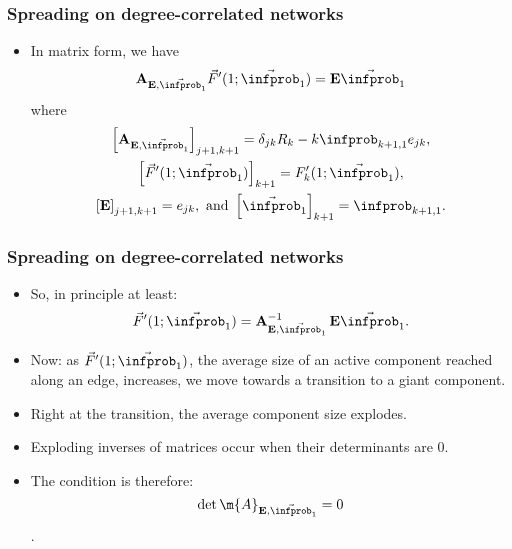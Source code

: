 \begin{frame}
  \frametitle{Spreading on degree-correlated networks}

  \begin{itemize}
  \item<1->
    In matrix form, we have
    $$
    \mathbf{A}_{\mathbf{E},\vec{\infprob}_1 }
    \vec{F}'(1;\vec{\infprob}_1)
    =
    \mathbf{E} \vec{\infprob}_1
    $$
    where 
    \begin{gather}
      \nonumber
      \left[ \mathbf{A}_{\mathbf{E},\vec{\infprob}_1 } \right]_{j+1,k+1}
      = 
      \delta_{jk} R_{k} 
      -
      k \infprob_{k+1,1} e_{jk},
      \\
      \nonumber
      \left[ \vec{F}'(1;\vec{\infprob}_1)  \right]_{k+1}
      = 
      F_{k}'(1;\vec{\infprob}_1),
      \\
      \nonumber
      \left[ \mathbf{E} \right]_{j+1,k+1}
      = 
      e_{jk},
      \
      \mbox{and} \  \left[ \vec{\infprob}_1 \right]_{k+1}
      =
      \infprob_{k+1,1}.
    \end{gather}
  \end{itemize}
\end{frame}

\begin{frame}
  \frametitle{Spreading on degree-correlated networks}

  \begin{itemize}
  \item<1->
    So, in principle at least:
    $$
    \vec{F}'(1;\vec{\infprob}_1)
    =
    \mathbf{A}_{\mathbf{E},\vec{\infprob}_1 }^{-1}
    \, \mathbf{E} \vec{\infprob}_1.
    $$
  \item<2->
    Now: as $\vec{F}'(1;\vec{\infprob}_1)$, 
    the average size of an active component
    reached along an edge, increases, we move towards
    a transition to a giant component.
  \item<3->
    Right at the transition, the average component
    size explodes.
  \item<4->
    Exploding inverses of matrices occur
    when their determinants are 0. 
  \item<5->
    The condition is therefore: 
    $$\det{\m{A}_{\mathbf{E},\vec{\infprob}_1}} = 0$$.
 \end{itemize}

\end{frame}

